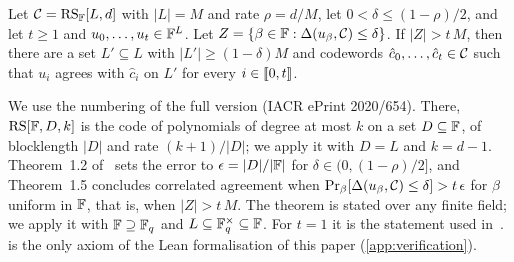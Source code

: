 \begin{theorem}\label{thm:curves}
Let $\mathcal{C} = \mathrm{RS}_{\mathbb{F}}[L,d]$ with $|L| = M$ and rate $\rho = d/M$, let $0 < \delta \le (1-\rho)/2$, and let $t \ge 1$ and $u_0,\dots,u_t \in \mathbb{F}^L$.
Let $Z = \{\beta \in \mathbb{F} : \Delta(u_\beta, \mathcal{C}) \le \delta\}$.
If $|Z| > t\,M$, then there are a set $L' \subseteq L$ with $|L'| \ge (1-\delta)M$ and codewords $\hat c_0, \dots, \hat c_t \in \mathcal{C}$ such that $u_i$ agrees with $\hat c_i$ on $L'$ for every $i \in \llbracket 0, t \rrbracket$.
\end{theorem}

We use the numbering of the full version (IACR ePrint 2020/654).
There, $\mathrm{RS}[\mathbb{F}, D, k]$ is the code of polynomials of degree at most $k$ on a set $D \subseteq \mathbb{F}$, of blocklength $|D|$ and rate $(k+1)/|D|$; we apply it with $D = L$ and $k = d-1$.
Theorem~1.2 of~\cite{BCIKS23} sets the error to $\epsilon = |D|/|\mathbb{F}|$ for $\delta \in (0, (1-\rho)/2]$, and Theorem~1.5 concludes correlated agreement when $\Pr_{\beta}[\Delta(u_\beta, \mathcal{C}) \le \delta] > t\,\epsilon$ for $\beta$ uniform in $\mathbb{F}$, that is, when $|Z| > t\,M$.
The theorem is stated over any finite field; we apply it with $\mathbb{F} \supseteq \mathbb{F}_q$ and $L \subseteq \mathbb{F}_q^\times \subseteq \mathbb{F}$.
For $t = 1$ it is the statement used in~\cite[Theorem~2.23]{Mkh26}.  is the only axiom of the Lean formalisation of this paper (\cref{app:verification}).
